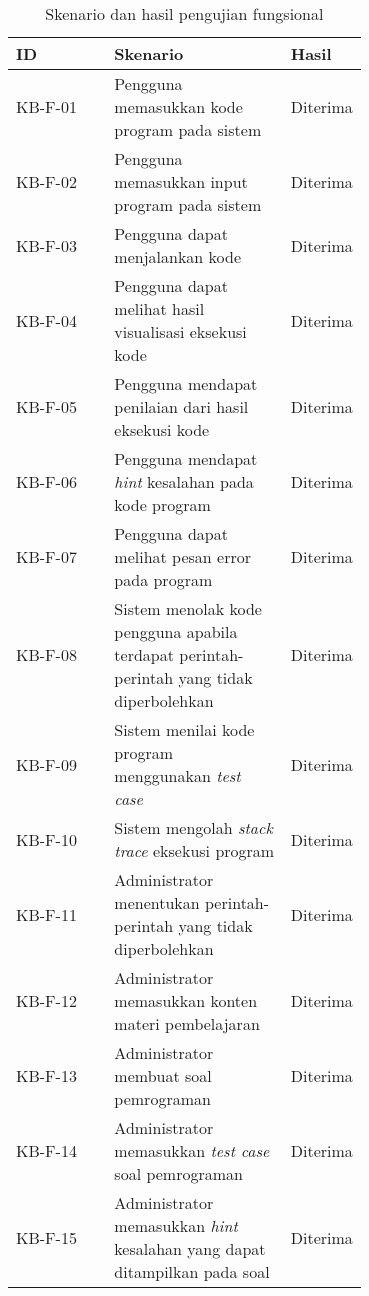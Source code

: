 \small
\begin{longtable}[c]{|l|>{\setlength{\baselineskip}{0.75\baselineskip}}p{0.5\linewidth}|>{\setlength{\baselineskip}{0.75\baselineskip}}p{0.2\linewidth}|}
  \caption{\normalsize Skenario dan hasil pengujian fungsional}
  \label{tab:pengujian-fungsional}                                                                                        \\
  \hline
  \rowcolor{gray!30}
  \textbf{ID} & \textbf{Skenario}                                                                        & \textbf{Hasil} \\ \hline
  \endfirsthead
  \endhead
  KB-F-01     & Pengguna memasukkan kode program pada sistem                                             & Diterima       \\ \hline
  KB-F-02     & Pengguna memasukkan input program pada sistem                                            & Diterima       \\ \hline
  KB-F-03     & Pengguna dapat menjalankan kode                                                          & Diterima       \\ \hline
  KB-F-04     & Pengguna dapat melihat hasil visualisasi eksekusi kode                                   & Diterima       \\ \hline
  KB-F-05     & Pengguna mendapat penilaian dari hasil eksekusi kode                                     & Diterima       \\ \hline
  KB-F-06     & Pengguna mendapat \textit{hint} kesalahan pada kode program                              & Diterima       \\ \hline
  KB-F-07     & Pengguna dapat melihat pesan error pada program                                          & Diterima       \\ \hline
  KB-F-08     & Sistem menolak kode pengguna apabila terdapat perintah-perintah yang tidak diperbolehkan & Diterima       \\ \hline
  KB-F-09     & Sistem menilai kode program menggunakan \textit{test case}                               & Diterima       \\ \hline
  KB-F-10     & Sistem mengolah \textit{stack trace} eksekusi program                                    & Diterima       \\ \hline
  KB-F-11     & Administrator menentukan perintah-perintah yang tidak diperbolehkan                      & Diterima       \\ \hline
  KB-F-12     & Administrator memasukkan konten materi pembelajaran                                      & Diterima       \\ \hline
  KB-F-13     & Administrator membuat soal pemrograman                                                   & Diterima       \\ \hline
  KB-F-14     & Administrator memasukkan \textit{test case} soal pemrograman                             & Diterima       \\ \hline
  KB-F-15     & Administrator memasukkan \textit{hint} kesalahan yang dapat ditampilkan pada soal        & Diterima       \\ \hline
\end{longtable}
\normalsize

